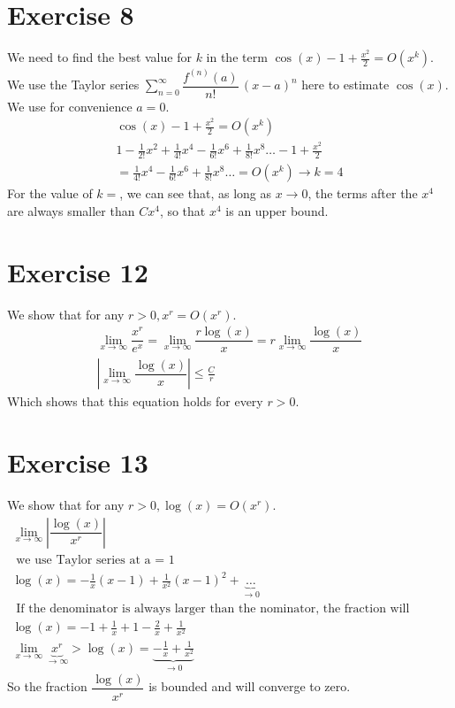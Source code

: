 \section{Exercise 8}
We need to find the best value for $k$ in the term $\cos(x) -1 + \frac{x^2}{2} = O(x^k) $. We use the Taylor series $ \sum_{n=0} ^ {\infty} \dfrac {f^{(n)}(a)}{n!} \, (x-a)^{n}$ here to estimate $\cos(x)$. We use for convenience $a=0$.
\begin{gather*}
\cos (x) -1 + \frac{x^2}{2} = O(x^k)\\
1 - \frac{1}{2!} x^2 + \frac{1}{4!} x^4 - \frac{1}{6!} x^6 + \frac{1}{8!} x^8 \ldots - 1 +\frac{x^2}{2} \\
= \frac{1}{4!} x^4 - \frac{1}{6!} x^6 + \frac{1}{8!} x^8 \ldots = O(x^k) \rightarrow k = 4
\end{gather*}
For the value of $k = $, we can see that, as long as $x \to 0$, the terms after the $x^4$ are always smaller than $C x^4$, so that $x^4$ is an upper bound.
\section{Exercise 12}
We show that for any $r > 0, x^r = O(x^r)$.
\begin{gather*}
\lim_{x \to \infty} \dfrac{x^r}{e^x} = \lim_{x \to \infty} \dfrac{r \log(x)}{x} = r \lim_{x \to \infty} \dfrac{\log(x)}{x}\\
\left| \lim_{x \to \infty} \dfrac{\log(x)}{x} \right| \leq \frac{C}{r} 
\end{gather*}
Which shows that this equation holds for every $r>0$.
\section{Exercise 13}
We show that for any $r > 0, \log(x) = O(x^r)$.
\begin{gather*}
\lim_{x \to \infty} \left| \dfrac{\log(x)}{x^r} \right| \\
\text{ we use Taylor series at a = 1 } \\
\log(x) = - \frac{1}{x}(x-1) + \frac{1}{x^2}(x-1)^2 + \underbrace{\ldots}_{\to 0}\\
\text{ If the denominator is always larger than the nominator, the fraction will converge to zero }\\
\log(x) = -1 + \frac{1}{x} + 1 - \frac{2}{x} + \frac{1}{x^2} \\
\lim_{x \to \infty} \underbrace{x^r}_{\to \infty} > \log(x) = \underbrace{-\frac{1}{x} + \frac{1}{x^2}}_{\to 0}
\end{gather*}
So the fraction $ \dfrac{\log(x)}{x^r} $ is bounded and will converge to zero.
